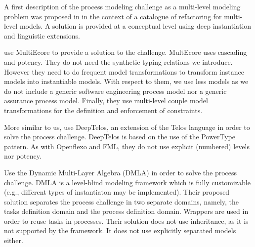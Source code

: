 

A first description of the process modeling challenge as a multi-level modeling problem was proposed in \cite{lara2018refactoring} in the context of a catalogue of refactoring for multi-level models. A solution is provided at a conceptual level using deep instantiation and linguistic extensions.

\cite{multiecore2019} use MultiEcore \citep{multecore2016} to provide a solution to the challenge. MultEcore uses cascading and potency. They do not need the synthetic typing relations we introduce. However they need to do frequent model transformations to transform instance models into instantiable models. With respect to them, we use less models as we do not include a generic software engineering process model nor a generic assurance process model. Finally, they use multi-level couple model transformations for the definition and enforcement of constraints.

More similar to us, \cite{deeptelos2019} use DeepTelos\citep{deeptelos2016}, an extension of the Telos language \citep{telos1990} in order to solve the process challenge. DeepTelos is based on the use of the PowerType \citep{atkinson2001essence} pattern. As with Openflexo and FML, they do not use explicit (numbered) levels nor potency.



\cite{dmla2019} Use the Dynamic Multi-Layer Algebra (DMLA)\citep{dmla2017} in order to solve the process challenge. DMLA is a level-blind modeling framework which is fully customizable (e.g., different types of instantiaton may be implemented). Their proposed solution separates the process challenge in two separate domains, namely, the tasks definition domain and the process definition domain. Wrappers are used in order to reuse tasks in processes. Their solution does not use inheritance, as it is not supported by the framework. It does not use explicitly separated models either.


